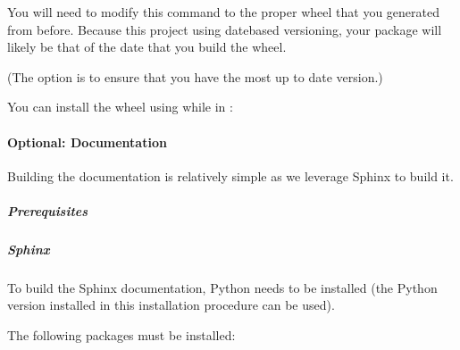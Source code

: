 \documentclass[letterpaper,11pt,english]{sphinxmanual}
\begin{document}
\sphinxAtStartPar
You will need to modify this command to the proper wheel that you generated
from before. Because this project using date\sphinxhyphen{}based versioning, your package
will likely be that of the date that you build the wheel.

\sphinxAtStartPar
(The  option is to ensure that you have the most up to date version.)

\sphinxAtStartPar
You can install the wheel using while in :

\begin{sphinxVerbatim}[commandchars=\\\{\}]
   
\end{sphinxVerbatim}

\sphinxstepscope


\paragraph{Optional: Documentation}
\label{\detokenize{technical/installation/documentation:optional-documentation}}\label{\detokenize{technical/installation/documentation:technical-installation-documentation}}\label{\detokenize{technical/installation/documentation::doc}}
\sphinxAtStartPar
Building the documentation is relatively simple as we leverage Sphinx to
build it.


\subparagraph{Prerequisites}
\label{\detokenize{technical/installation/documentation:prerequisites}}

\subparagraph{Sphinx}
\label{\detokenize{technical/installation/documentation:sphinx}}
\sphinxAtStartPar
To build the Sphinx documentation, Python needs to be installed (the Python
version installed in this installation procedure can be used).

\sphinxAtStartPar
The following packages must be installed:

\begin{sphinxVerbatim}[commandchars=\\\{\}]
   
\end{sphinxVerbatim}
\end{document}
